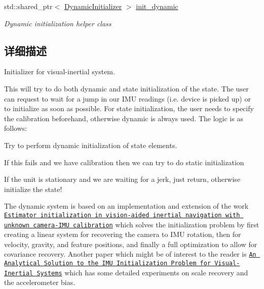 \begin{DoxyCompactItemize}
\mbox{\label{classov__init_1_1InertialInitializer_af35694c9b263ce6e8757b20723aef712}} 
std\+::shared\+\_\+ptr$<$ \hyperlink{classov__init_1_1DynamicInitializer}{Dynamic\+Initializer} $>$ \hyperlink{classov__init_1_1InertialInitializer_af35694c9b263ce6e8757b20723aef712}{init\+\_\+dynamic}
\begin{DoxyCompactList}\small\item\em Dynamic initialization helper class \end{DoxyCompactList}\end{DoxyCompactItemize}


\subsection{详细描述}
Initializer for visual-\/inertial system. 

This will try to do both dynamic and state initialization of the state. The user can request to wait for a jump in our I\+MU readings (i.\+e. device is picked up) or to initialize as soon as possible. For state initialization, the user needs to specify the calibration beforehand, otherwise dynamic is always used. The logic is as follows\+:
\begin{DoxyEnumerate}
\item Try to perform dynamic initialization of state elements.
\item If this fails and we have calibration then we can try to do static initialization
\item If the unit is stationary and we are waiting for a jerk, just return, otherwise initialize the state!
\end{DoxyEnumerate}

The dynamic system is based on an implementation and extension of the work \href{https://ieeexplore.ieee.org/document/6386235}{\tt Estimator initialization in vision-\/aided inertial navigation with unknown camera-\/\+I\+MU calibration} \cite{Dong2012IROS} which solves the initialization problem by first creating a linear system for recovering the camera to I\+MU rotation, then for velocity, gravity, and feature positions, and finally a full optimization to allow for covariance recovery. Another paper which might be of interest to the reader is \href{https://ieeexplore.ieee.org/abstract/document/9462400}{\tt An Analytical Solution to the I\+MU Initialization Problem for Visual-\/\+Inertial Systems} which has some detailed experiments on scale recovery and the accelerometer bias. 

